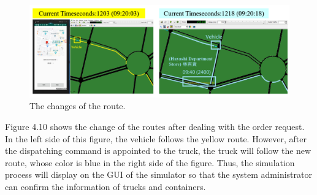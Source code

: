 \documentclass[12pt]{ksthesis}
\begin{document}
\begin{thesis}
{\begin{figure}[H]
\centering
\includegraphics[width=1.0\textwidth]{./figures/F4-10-ChangeRoutes.PNG}
\caption{\large The changes of the route.}
\vspace{0.5cm}
\label{Fig:Change_of_route}
\end{figure}


Figure 4.10 shows the change of the routes after dealing with the order request. 
In the left side of this figure, the vehicle follows the yellow route. However, after the dispatching command is appointed to the truck, the truck will follow the new route, whose color is blue in the right side of the figure. 
Thus, the simulation process will display on the GUI of the simulator so that the system administrator can confirm the information of trucks and containers. 

}
\end{thesis}
\end{document}
